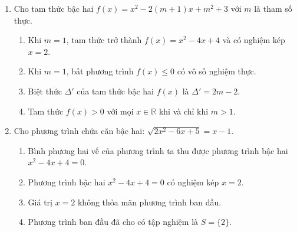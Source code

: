 \documentclass[12pt,a4paper]{article}
\begin{document}
\begin{enumerate}
\item Cho tam thức bậc hai $f(x) = x^2 - 2(m + 1)x + m^2 + 3$ với $m$ là tham số thực.
\begin{enumerate}
    \item Khi $m = 1$, tam thức trở thành $f(x) = x^2 - 4x + 4$ và có nghiệm kép $x = 2$.
    \item Khi $m = 1$, bất phương trình $f(x) \le 0$ có vô số nghiệm thực.
    \item Biệt thức $\Delta'$ của tam thức bậc hai $f(x)$ là $\Delta' = 2m - 2$.
    \item Tam thức $f(x) > 0$ với mọi $x \in \mathbb{R}$ khi và chỉ khi $m > 1$.
\end{enumerate}

\item Cho phương trình chứa căn bậc hai: $\sqrt{2x^2 - 6x + 5} = x - 1$.
\begin{enumerate}
    \item Bình phương hai vế của phương trình ta thu được phương trình bậc hai $x^2 - 4x + 4 = 0$.
    \item Phương trình bậc hai $x^2 - 4x + 4 = 0$ có nghiệm kép $x = 2$.
    \item Giá trị $x = 2$ không thỏa mãn phương trình ban đầu.
    \item Phương trình ban đầu đã cho có tập nghiệm là $S = \{2\}$.
\end{enumerate}
\end{enumerate}
\end{document}
